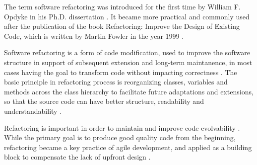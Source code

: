 


The term software refactoring was introduced for the first time by William F. Opdyke in his Ph.D. dissertation \cite{opdykeRefactoring}. It became more practical and commonly used after the publication of the book Refactoring: Improve the Design of Existing Code, which is written by Martin Fowler in the year 1999 \cite{fowlerRefactor}. 

Software refactoring is a form of code modification, used to improve the software structure in support of subsequent extension and long-term maintanence, in most cases having the goal to transform code without impacting correctness \cite{brownAntiPatterns}. The basic principle in refactoring process is reorganizing classes, variables and methods across the class hierarchy to facilitate future adaptations and extensions, so that the source code can have better structure, readability and understandability \cite{abebeLiterature}. 

Refactoring is important in order to maintain and improve code evolvability \cite{mantylaDrivers}. While the primary goal is to produce good quality code from the beginning, refactoring became a key practice of agile development, and applied as a building block to compensate the lack of upfront design \cite{mantylaDrivers}.


